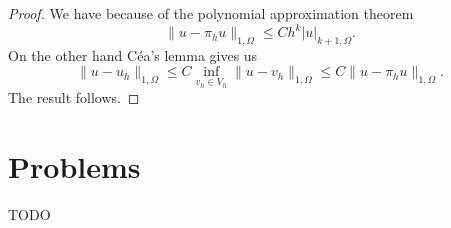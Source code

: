 \begin{proof}
We have because of the polynomial approximation theorem
  $$\|u-\pi_h u\|_{1,\Omega}\leq C h^{k}|u|_{k+1,\Omega}.$$
On the other hand C\'ea's lemma gives us
$$\|u-u_h\|_{1,\Omega}\leq C\inf_{v_h\in V_h}\|u-v_h\|_{1,\Omega}
\leq C \|u-\pi_h u\|_{1,\Omega}.$$
The result follows.
\end{proof}

\section{Problems}

\begin{exercise}
  TODO
\end{exercise}
